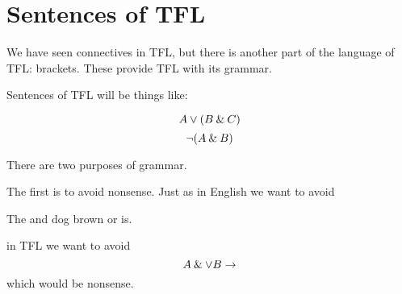 

\chapter{Sentences of TFL}\label{s:TFLSentences}

We have seen connectives in TFL, but there is another part of the language of TFL: brackets. These provide TFL with its grammar. 

Sentences of TFL will be things like:

$$A\vee (B\mathbin{\&} C)$$ $$\neg (A\mathbin{\&} B)$$

There are two purposes of grammar. 

The first is to avoid nonsense. 
Just as in English we want to avoid
\begin{center} 
The and dog brown or is.
\end{center}
in TFL we want to avoid 
$$A\mathbin{\&}\vee B\rightarrow$$
which would be nonsense. 


